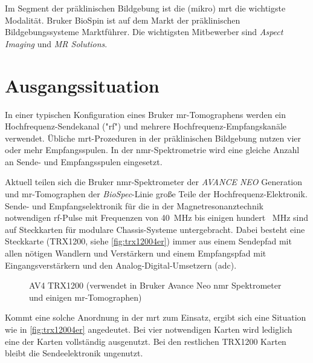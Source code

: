 Im Segment der präklinischen Bildgebung ist die (mikro) \gls{mrt} die wichtigste Modalität. Bruker BioSpin ist auf dem Markt der präklinischen Bildgebungssysteme Marktführer. Die wichtigsten Mitbewerber sind \textit{Aspect Imaging} und \textit{MR Solutions}.
 
\section{Ausgangssituation}
In einer typischen Konfiguration eines Bruker \gls{mr}-Tomographens werden ein Hochfrequenz-Sendekanal ("\gls{rf}") und mehrere Hochfrequenz-Empfangskanäle verwendet. Übliche \gls{mrt}-Prozeduren in der präklinischen Bildgebung nutzen vier oder mehr Empfangsspulen. In der \gls{nmr}-Spektrometrie wird eine gleiche Anzahl an Sende- und Empfangsspulen eingesetzt.

Aktuell teilen sich die Bruker \gls{nmr}-Spektrometer der \textit{AVANCE NEO} Generation und \gls{mr}-Tomographen der \textit{BioSpec}-Linie große Teile der Hochfrequenz-Elektronik. Sende- und Empfangselektronik für die in der Magnetresonanztechnik notwendigen \gls{rf}-Pulse mit Frequenzen von \SI{40}{\mega\hertz} bis einigen hundert \SI{}{\mega\hertz} sind auf Steckkarten für modulare Chassis-Systeme untergebracht. Dabei besteht eine Steckkarte (TRX1200, siehe \autoref{fig:trx12004er}) immer aus einem Sendepfad mit allen nötigen Wandlern und Verstärkern und einem Empfangspfad mit Eingangsverstärkern und den Analog-Digital-Umsetzern (\gls{adc}).

\begin{figure}[H]
	\centering
	\caption[Bruker Avance Neo TRX1200 Karte]{AV4 TRX1200 (verwendet in Bruker Avance Neo \gls{nmr} Spektrometer und einigen \gls{mr}-Tomographen)}
	\label{fig:trx12004er}
\end{figure}

Kommt eine solche Anordnung in der \gls{mrt} zum Einsatz, ergibt sich eine Situation wie in \autoref{fig:trx12004er} angedeutet. Bei vier notwendigen Karten wird lediglich eine der Karten vollständig ausgenutzt. Bei den restlichen TRX1200 Karten bleibt die Sendeelektronik ungenutzt.


